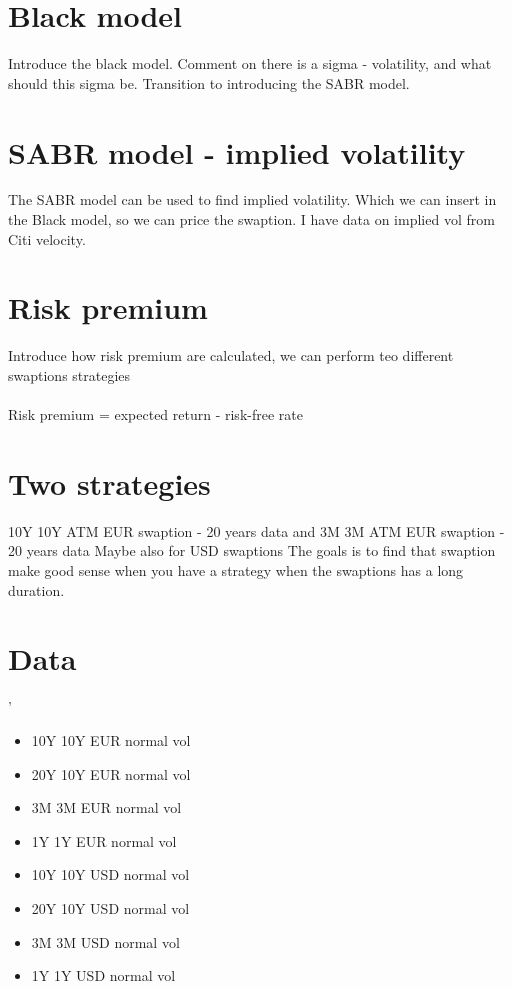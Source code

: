 \documentclass{article}
\begin{document}
\section{Black model}
Introduce the black model.
Comment on there is a sigma - volatility, and what should this sigma be. Transition to introducing the SABR model.

\section{SABR model - implied volatility}
The SABR model can be used to find implied volatility. Which we can insert in the Black model, so we can price the swaption. 
I have data on implied vol from Citi velocity.

\section{Risk premium}
Introduce how risk premium are calculated, we can perform teo different swaptions strategies 
\\\\
Risk premium = expected return - risk-free rate 

\section{Two strategies}

10Y 10Y ATM EUR swaption - 20 years data and 3M 3M ATM EUR swaption - 20 years data 
\medskip
Maybe also for USD swaptions
\medskip
The goals is to find that swaption make good sense when you have a strategy when the swaptions has a long duration. 

\section{Data}'

\begin{itemize}
  \item 10Y 10Y EUR normal vol 
  \item 20Y 10Y EUR normal vol 
  \item 3M 3M EUR normal vol
  \item 1Y 1Y EUR normal vol 
  \item 10Y 10Y USD normal vol 
  \item 20Y 10Y USD normal vol 
  \item 3M 3M USD normal vol
  \item 1Y 1Y USD normal vol 
\end{itemize}
\end{document}
